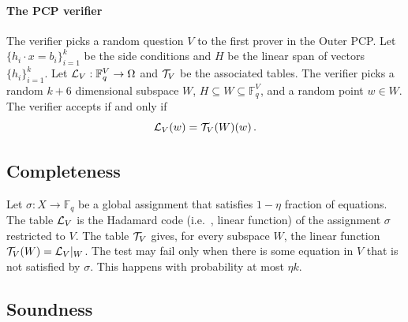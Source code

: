 \documentclass[10pt]{article}
\theoremstyle{definition}
\providecommand{\ie}{i.e.\ }
\numberwithin{equation}{section}
\newcommand\calL{{\cal L}}
\newcommand\calT{{\cal T}}
\newcommand\F{\mathbb{F}}
\renewcommand{\mapsto}{\to}
\begin{document}
\paragraph{The PCP verifier}  The verifier picks a random question
$V$ to the first prover in the Outer PCP\@. Let $\{h_i\cdot x = b_i\}_{i=1}^k$ be the side conditions and $H$ be the linear span of vectors $\{h_i\}_{i=1}^k$. Let
$\calL_V: \F_q^V \mapsto \Omega$ and $\calT_V$ be the
associated tables. The verifier picks a random $k+6$ dimensional
subspace $W$, $H \subseteq W \subseteq \F_q^V$, and a random point $w \in W$.
The verifier accepts if and only if
 $$  \calL_V(w) = \calT_V(W) (w)\,. $$

\subsection{Completeness}

Let $\sigma: X \mapsto \F_q$ be a global assignment that satisfies $1-\eta$ fraction
of equations. The table $\calL_V$ is the Hadamard code (\ie, linear function)
of the assignment $\sigma$ restricted
to $V$. The table $\calT_V$ gives, for every subspace $W$, the linear function
$\calT_V(W) = \calL_V|_W$.
The test may fail only when there is some equation in $V$ that is not satisfied
by $\sigma$. This happens with probability at most $\eta k$.



\subsection{Soundness}
\end{document}
